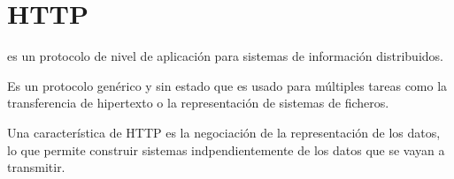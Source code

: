 
 \section{HTTP}

  es un protocolo de nivel de aplicación
 para sistemas de información distribuidos.

 Es un protocolo genérico y sin estado que es usado para múltiples tareas como
 la transferencia de hipertexto o la representación de sistemas de ficheros.

 Una característica de HTTP es la negociación de la representación de los datos,
 lo que permite construir sistemas indpendientemente de los datos que se vayan a
 transmitir. \emph{\parencite{Reference18}}
